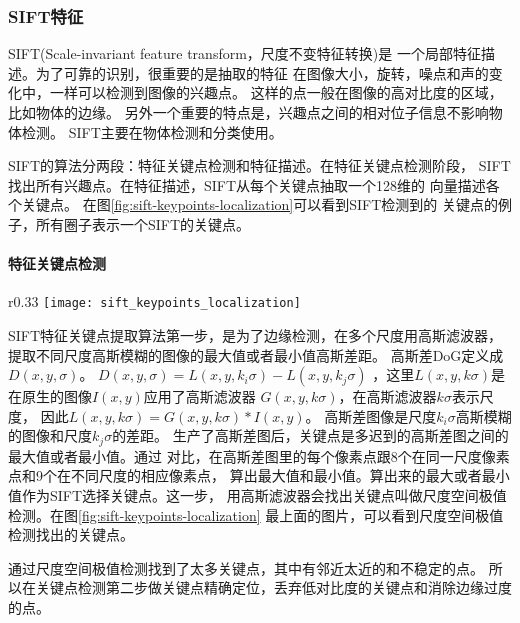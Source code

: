 \subsubsection{SIFT特征}
SIFT(Scale-invariant feature transform，尺度不变特征转换)是
一个局部特征描述。\cite{lowe1999object}为了可靠的识别，很重要的是抽取的特征
在图像大小，旋转，噪点和声的变化中，一样可以检测到图像的兴趣点。
这样的点一般在图像的高对比度的区域，比如物体的边缘。
另外一个重要的特点是，兴趣点之间的相对位子信息不影响物体检测。
SIFT主要在物体检测和分类使用。

SIFT的算法分两段：特征关键点检测和特征描述。在特征关键点检测阶段，
SIFT找出所有兴趣点。在特征描述，SIFT从每个关键点抽取一个128维的
向量描述各个关键点。\cite{wiki:sift}
在图\ref{fig:sift-keypoints-localization}可以看到SIFT检测到的
关键点的例子，所有圈子表示一个SIFT的关键点。

\clearpage
\paragraph*{特征关键点检测}
\begin{wrapfigure}{r}{0.33\textwidth}
  \centering
    \texttt{[image: sift\_keypoints\_localization]}
    \caption{SIFT关键点检测过程。图片源：\cite{wiki:sift}}
  \label{fig:sift-keypoints-localization}
\end{wrapfigure}
SIFT特征关键点提取算法第一步，是为了边缘检测，在多个尺度用高斯滤波器，
提取不同尺度高斯模糊的图像的最大值或者最小值高斯差距。
高斯差DoG定义成$D \left( x, y, \sigma \right)$。
$D \left( x, y, \sigma \right) = L \left( x, y, k_i\sigma \right) - L \left( x, y, k_j\sigma \right)$
，这里$L \left( x, y, k\sigma \right)$是在原生的图像$I \left( x, y \right)$应用了高斯滤波器
$G \left( x, y, k\sigma \right)$，在高斯滤波器$k \sigma$表示尺度，
因此$L \left( x, y, k\sigma \right) = G \left( x, y, k\sigma \right) * I \left( x, y \right)$。
高斯差图像是尺度$k_i\sigma$高斯模糊的图像和尺度$k_j\sigma$的差距。
生产了高斯差图后，关键点是多迟到的高斯差图之间的最大值或者最小值。通过
对比，在高斯差图里的每个像素点跟8个在同一尺度像素点和9个在不同尺度的相应像素点，
算出最大值和最小值。算出来的最大或者最小值作为SIFT选择关键点。这一步，
用高斯滤波器会找出关键点叫做尺度空间极值检测。在图\ref{fig:sift-keypoints-localization}
最上面的图片，可以看到尺度空间极值检测找出的关键点。

通过尺度空间极值检测找到了太多关键点，其中有邻近太近的和不稳定的点。
所以在关键点检测第二步做关键点精确定位，丢弃低对比度的关键点和消除边缘过度的点。

